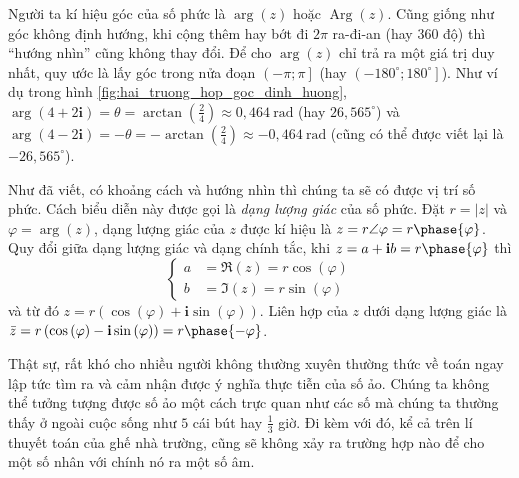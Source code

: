 \documentclass[a4paper, titlepage, openany]{book}
\DeclareMathOperator{\Arg}{Arg}
\newcommand\dblquote[1]{\textquotedblleft #1\textquotedblright}
\begin{document}
Người ta kí hiệu góc của số phức là $\arg{(z)}$ hoặc $\Arg{(z)}$. Cũng giống như góc không định hướng, khi cộng thêm hay bớt đi $2\pi$ ra-đi-an (hay $360$ độ) thì \dblquote{hướng nhìn} cũng không thay đổi. Để cho $\arg{(z)}$ chỉ trả ra một giá trị duy nhất, quy ước là lấy góc trong nửa đoạn $\left(-\pi;\pi\right]$ (hay $\left(-180^\circ;180^\circ\right]$). Như ví dụ trong hình \ref{fig:hai_truong_hop_goc_dinh_huong}, $\arg{(4+2\mathbf{i})} = \theta = \arctan\left(\frac{2}{4}\right) \approx 0,464~\text{rad}$ (hay $26,565^\circ$) và $\arg{(4-2\mathbf{i})} = -\theta = -\arctan\left(\frac{2}{4}\right) \approx -0,464~\text{rad}$ (cũng có thể được viết lại là $-26,565^\circ$).

Như đã viết, có khoảng cách và hướng nhìn thì chúng ta sẽ có được vị trí số phức. Cách biểu diễn này được gọi là \emph{dạng lượng giác} của số phức. Đặt $r = |z|$ và $\varphi = \arg{(z)}$, dạng lượng giác của $z$ được kí hiệu là $z = r \angle \varphi = r \phase{\varphi}$. Quy đổi giữa dạng lượng giác và dạng chính tắc, khi $z = a + \mathbf{i}b = r \phase{\varphi}$ thì
\[
\left\{
\begin{aligned}
   a &= \Re{(z)} = r \cos{(\varphi)} \\ 
   b &= \Im{(z)} = r \sin{(\varphi)}
\end{aligned}
\right.
\]
và từ đó $z = r\left(\cos{(\varphi)} + \mathbf{i}\sin{(\varphi)}\right)$. Liên hợp của $z$ dưới dạng lượng giác là $\bar{z} = r\left(\cos{(\varphi)} - \mathbf{i}\sin{(\varphi)}\right) = r \phase{-\varphi}$.



Thật sự, rất khó cho nhiều người không thường xuyên thường thức về toán ngay lập tức tìm ra và cảm nhận được ý nghĩa thực tiễn của số ảo. Chúng ta không thể tưởng tượng được số ảo một cách trực quan như các số mà chúng ta thường thấy ở ngoài cuộc sống như $5$ cái bút hay $\frac{1}{3}$ giờ. Đi kèm với đó, kể cả trên lí thuyết toán của ghế nhà trường, cũng sẽ không xảy ra trường hợp nào để cho một số nhân với chính nó ra một số âm. 
\end{document}
